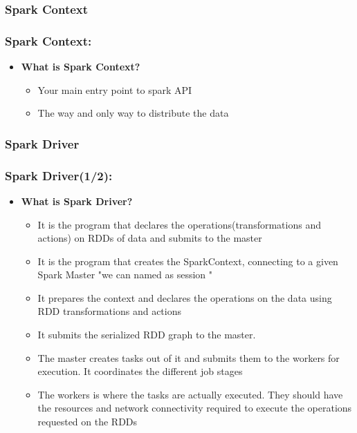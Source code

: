 %
%
%


\subsubsection{Spark Context}

\begin{frame}
  \frametitle{Spark Context:}
	\begin{itemize}[<+->]
		\item \textbf{What is Spark Context?}
			\begin{itemize}
					\item Your main entry point to spark API
					\item The way and only way to distribute the data
			\end{itemize}
	\end{itemize}
\end{frame}

%
%
%


\subsubsection{Spark Driver}

\begin{frame}
  \frametitle{Spark Driver(1/2):}
	\begin{itemize}[<+->]
		\item \textbf{What is Spark Driver?}
			\begin{itemize}
				\item It is the program that declares the operations(transformations and actions) on RDDs of data and submits to the master
				\item It is the program that creates the SparkContext, connecting to a given Spark Master "we can named as session "
				\item It prepares the context and declares the operations on the data using RDD transformations and actions
				\item It submits the serialized RDD graph to the master. 
				\item The master creates tasks out of it and submits them to the workers for execution. It coordinates the different job stages
				\item The workers is where the tasks are actually executed. They should have the resources and network connectivity required to execute the operations requested on the RDDs
			\end{itemize}
	\end{itemize}
\end{frame}


